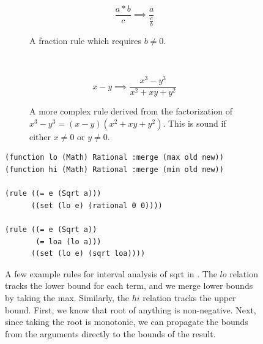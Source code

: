 \begin{figure}
  \begin{minipage}{0.40\linewidth}
  \begin{subfigure}{\linewidth}
    \[
      \frac{a*b}{c} \implies \frac{a}{\frac{c}{b}}
    \]
    \caption{
      A fraction rule which requires $b \neq 0$.
    }
    \label{fig:herbierule2}
  \end{subfigure}
  \\[1em]
  \begin{subfigure}{\linewidth}
    \[
      x - y \implies \frac{x^3-y^3}{x^2+xy+y^2}
    \]
    \caption{
      A more complex rule derived from
       the factorization of $x^3-y^3 = (x-y)(x^2+xy+y^2)$.
      This is sound if either $x \neq 0 $ or $y \neq 0$.
    }
    \label{fig:herbierule}
  \end{subfigure}
  \caption{
    Herbie~\cite{herbie} uses
    rewrite rules to create program variants
    with less floating-point error from phenomena like cancellation.
    Some rules are only sound under certain conditions.
  }
  \end{minipage}
  \hfill
  \begin{minipage}{0.55\linewidth}
  \begin{lstlisting}[language=egglog]
(function lo (Math) Rational :merge (max old new))
(function hi (Math) Rational :merge (min old new))

(rule ((= e (Sqrt a)))
      ((set (lo e) (rational 0 0))))

(rule ((= e (Sqrt a))
       (= loa (lo a)))
      ((set (lo e) (sqrt loa))))
  \end{lstlisting}
\caption{
  A few example rules for interval analysis of sqrt in \egglog.
  The $lo$ relation tracks the lower bound for each term,
   and we merge lower bounds by taking the max.
  Similarly, the $hi$ relation tracks the upper bound.
  First, we know that root of anything is non-negative.
  Next, since taking the root is monotonic,
   we can propagate the bounds from the arguments
   directly to the bounds of the result.
}
\label{fig:egglogsqrt}
  \end{minipage}
\end{figure}

